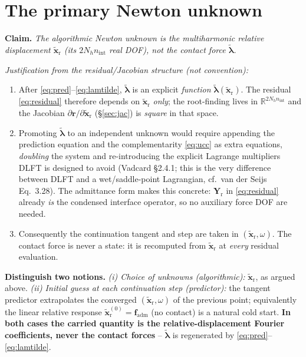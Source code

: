 \documentclass[11pt]{article}
\newcommand{\R}{\mathbb{R}}
\newcommand{\fadm}{\bm{f}_{\!\mathrm{adm}}}
\newcommand{\xr}{\tilde{\bm{x}}_{\mathrm r}}      %
\newcommand{\lamt}{\tilde{\bm{\lambda}}}          %
\newcommand{\Yr}{\bm{Y}_{\mathrm r}}
\begin{document}
\section{The primary Newton unknown}
\noindent\textbf{Claim.} \emph{The algorithmic Newton unknown is the
multiharmonic relative displacement $\xr$ (its $2N_h n_{\mathrm{int}}$ real
DOF), not the contact force $\lamt$.}

\smallskip\noindent\emph{Justification from the residual/Jacobian structure
(not convention):}
\begin{enumerate}[leftmargin=1.6em,itemsep=2pt]
\item After \eqref{eq:pred}--\eqref{eq:lamtilde}, $\lamt$ is an explicit
\emph{function} $\lamt(\xr)$. The residual \eqref{eq:residual} therefore
depends on $\xr$ \emph{only}; the root-finding lives in
$\R^{2N_h n_{\mathrm{int}}}$ and the Jacobian
$\partial\bm r/\partial\xr$ (\S\ref{sec:jac}) is \emph{square} in that
space.
\item Promoting $\lamt$ to an independent unknown would require appending
the prediction equation and the complementarity \eqref{eq:ucc} as extra
equations, \emph{doubling} the system and re-introducing the explicit
Lagrange multipliers DLFT is designed to avoid (Vadcard \S2.4.1; this is
the very difference between DLFT and a wet/saddle-point Lagrangian, cf.\
van der Seijs Eq.~3.28). The admittance form makes this concrete: $\Yr$
in \eqref{eq:residual} already \emph{is} the condensed interface operator,
so no auxiliary force DOF are needed.
\item Consequently the continuation tangent and step are taken in
$(\xr,\omega)$. The contact force is never a state: it is recomputed from
$\xr$ at \emph{every} residual evaluation.
\end{enumerate}

\noindent\textbf{Distinguish two notions.}
\emph{(i) Choice of unknowns (algorithmic):} $\xr$, as argued above.
\emph{(ii) Initial guess at each continuation step (predictor):} the
tangent predictor extrapolates the converged $(\xr,\omega)$ of the
previous point; equivalently the linear relative response
$\xr^{(0)}=\fadm$ (no contact) is a natural cold start. \textbf{In both
cases the carried quantity is the relative-displacement Fourier
coefficients, never the contact forces} -- $\lamt$ is regenerated by
\eqref{eq:pred}--\eqref{eq:lamtilde}.
\end{document}
